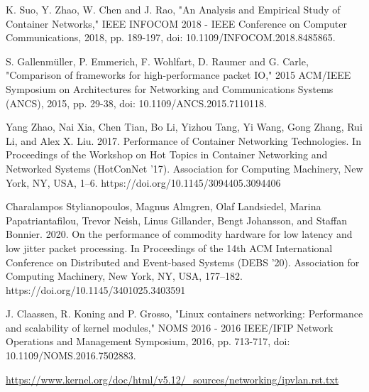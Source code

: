 \documentclass[conference]{IEEEtran}
\begin{document}

%
%
%
\begin{thebibliography}{1}

K. Suo, Y. Zhao, W. Chen and J. Rao, "An Analysis and Empirical Study of Container Networks," IEEE INFOCOM 2018 - IEEE Conference on Computer Communications, 2018, pp. 189-197, doi: 10.1109/INFOCOM.2018.8485865.

S. Gallenmüller, P. Emmerich, F. Wohlfart, D. Raumer and G. Carle, "Comparison of frameworks for high-performance packet IO," 2015 ACM/IEEE Symposium on Architectures for Networking and Communications Systems (ANCS), 2015, pp. 29-38, doi: 10.1109/ANCS.2015.7110118.

Yang Zhao, Nai Xia, Chen Tian, Bo Li, Yizhou Tang, Yi Wang, Gong Zhang, Rui Li, and Alex X. Liu. 2017. Performance of Container Networking Technologies. In Proceedings of the Workshop on Hot Topics in Container Networking and Networked Systems (HotConNet '17). Association for Computing Machinery, New York, NY, USA, 1–6. https://doi.org/10.1145/3094405.3094406

Charalampos Stylianopoulos, Magnus Almgren, Olaf Landsiedel, Marina Papatriantafilou, Trevor Neish, Linus Gillander, Bengt Johansson, and Staffan Bonnier. 2020. On the performance of commodity hardware for low latency and low jitter packet processing. In Proceedings of the 14th ACM International Conference on Distributed and Event-based Systems (DEBS '20). Association for Computing Machinery, New York, NY, USA, 177–182. https://doi.org/10.1145/3401025.3403591

J. Claassen, R. Koning and P. Grosso, "Linux containers networking: Performance and scalability of kernel modules," NOMS 2016 - 2016 IEEE/IFIP Network Operations and Management Symposium, 2016, pp. 713-717, doi: 10.1109/NOMS.2016.7502883.

\url{https://www.kernel.org/doc/html/v5.12/_sources/networking/ipvlan.rst.txt}
\end{thebibliography}


\end{document}
